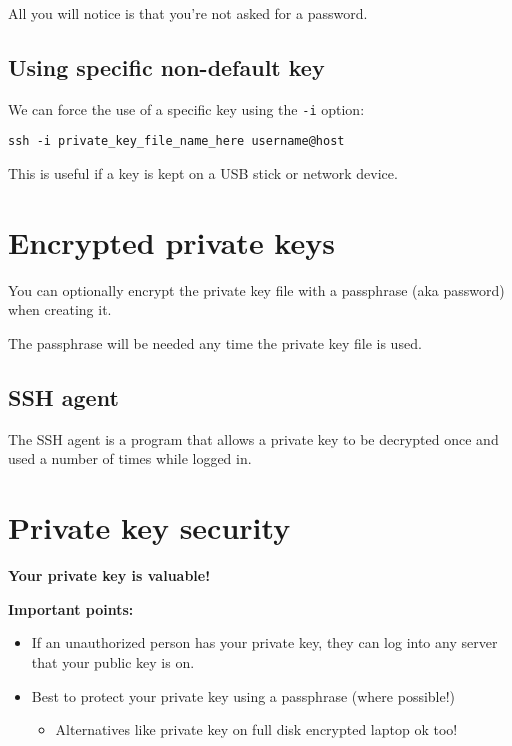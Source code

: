 \documentclass[slides]{pgnotes}
\begin{document}
All you will notice is that you're not asked for a password. 

\subsection{Using specific non-default key}

We can force the use of a specific key using the \texttt{-i} option:

\begin{verbatim}
ssh -i private_key_file_name_here username@host
\end{verbatim}

This is useful if a key is kept on a USB stick or network device.


\section{Encrypted private keys}

You can optionally encrypt the private key file with a passphrase (aka password) when creating it.

The passphrase will be needed any time the private key file is used.


\subsection{SSH agent}

The SSH agent is a program that allows a private key to be decrypted once and used a number of times while logged in.


\section{Private key security}

\begin{center}
  \textbf{\Large Your private key is valuable!}
\end{center}

\textbf{Important points:}

\begin{itemize}
\item If an unauthorized person has your private key, they can log into any server that your public key is on.
\item Best to protect your private key using a passphrase (where possible!)
  \begin{itemize}
  \item Alternatives like private key on full disk encrypted laptop ok too!
  \end{itemize}
\end{itemize}
\end{document}
